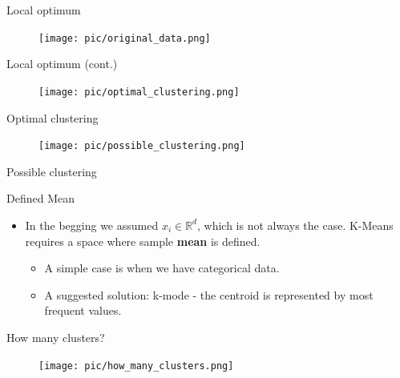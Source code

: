 \documentclass[serif, aspectratio=169]{beamer}
\begin{document}
\begin{frame}{Local optimum}
    \begin{itemize}
        \begin{figure}
            \centering
            \texttt{[image: pic/original\_data.png]}
        \end{figure}
    \end{itemize}
\end{frame}
\begin{frame}{Local optimum (cont.)}
    \begin{minipage}{0.5\textwidth}
        \begin{figure}
            \centering
            \texttt{[image: pic/optimal\_clustering.png]}
        \end{figure}
        \vfill
        \begin{center}
            Optimal clustering
        \end{center}
    \end{minipage}%
    \begin{minipage}{0.5\textwidth}
        \begin{figure}
            \centering
            \texttt{[image: pic/possible\_clustering.png]}
        \end{figure}
        \vfill
        \begin{center}
            Possible clustering
        \end{center}
    \end{minipage}
\end{frame}


\begin{frame}{Defined Mean}
    \begin{itemize}
        \item In the begging we assumed $x_i \in \mathbb{R}^d$, which is not always the case. K-Means requires a space where sample \textbf{mean} is defined.
        \begin{itemize}
            \item A simple case is when we have categorical data. 
            \item  A suggested solution: k-mode - the centroid is represented by most frequent values.
        \end{itemize}


    \end{itemize}
\end{frame}

\begin{frame}{How many clusters?}
    \begin{figure}
        \centering
        \texttt{[image: pic/how\_many\_clusters.png]}
    \end{figure}
\end{frame}
\end{document}
